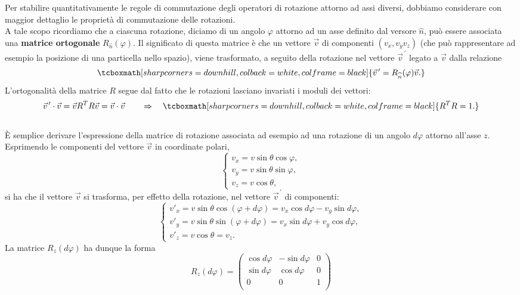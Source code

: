 \documentclass[a4paper,12pt,oneside]{book}
\begin{document}
Per stabilire quantitativamente le regole di commutazione degli operatori di rotazione attorno ad assi diversi, dobbiamo considerare con maggior dettaglio le proprietà di commutazione delle rotazioni.\\

A tale scopo ricordiamo che a ciascuna rotazione, diciamo di un angolo $\varphi$ attorno ad un asse definito dal versore $\widehat{n}$, può essere associata una \textbf{matrice ortogonale} $R_{\widehat{n}} (\varphi)$. Il significato di questa matrice è che un vettore $\vec{v}$ di componenti $(v_x, v_y v_z) $ (che può rappresentare ad esempio la posizione di una particella nello spazio), viene trasformato, a seguito della rotazione nel vettore $\vec{v}^{\, \prime}$ legato a $\vec{v}$ dalla relazione
	\begin{equation}
		\tcboxmath[sharp corners=downhill, colback=white, colframe=black]{
			\vec{v}^{\, \prime}= R_{\widehat{n}} (\varphi)\vec{v}.
			}
	\end{equation}
L'ortogonalità della matrice $R$ segue dal fatto che le rotazioni lasciano invariati i moduli dei vettori:
	\begin{equation}
		\vec{v}^{\, \prime}\cdot\vec{v} = \vec{v}R^T R \vec{v}= \vec{v}\cdot\vec{v} \qquad \Rightarrow \quad
		\tcboxmath[sharp corners=downhill, colback=white, colframe=black]{
 		R^T R =1.
 		}
	\end{equation}\\
	
È semplice derivare l'espressione della matrice di rotazione associata ad esempio ad una rotazione di un angolo $d\varphi $ attorno all'asse $z$. Esprimendo le componenti del vettore $\vec{v}$ in coordinate polari,
	\begin{equation}
		\begin{cases}
			v_x = v \sin\theta \cos \varphi ,\\
			v_y = v \sin\theta \sin \varphi ,\\
			v_z = v \cos\theta ,
		\end{cases}
	\end{equation}
si ha che il vettore $\vec{v}$ si trasforma, per effetto della rotazione, nel vettore $\vec{v}^{\, \prime}$ di componenti:
	\begin{equation}
		\begin{cases}
			v'_x = v \sin\theta \cos (\varphi +d\varphi )= v_x \cos d\varphi - v_y \sin d\varphi ,\\
			v'_y = v \sin\theta \sin (\varphi +d\varphi ) = v_x \sin d\varphi + v_y \cos d\varphi ,\\
			v'_z = v \cos\theta = v_z .
	\end{cases}
	\end{equation}
La matrice $R_z (d\varphi)$ ha dunque la forma
	\begin{equation}
		R_z (d\varphi)=
		\begin{pmatrix}
			\cos d\varphi & -\sin d\varphi & 0\\
			\sin d\varphi & \cos d\varphi & 0 \\
			0 & 0 & 1 \\
		\end{pmatrix}
	\end{equation}\\
	
\end{document}
